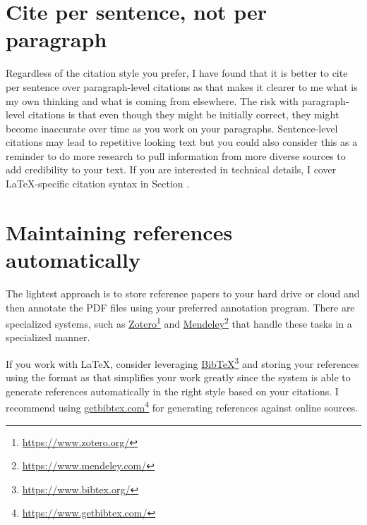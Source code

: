 \section{Cite per sentence, not per paragraph}

Regardless of the citation style you prefer, I have found that it is better to cite per sentence over paragraph-level citations as that makes it clearer to me what is my own thinking and what is coming from elsewhere.
The risk with paragraph-level citations is that even though they might be initially correct, they might become inaccurate over time as you work on your paragraphs.
Sentence-level citations may lead to repetitive looking text but you could also consider this as a reminder to do more research to pull information from more diverse sources to add credibility to your text.
If you are interested in technical details, I cover LaTeX-specific citation syntax in Section .



\section{Maintaining references automatically}


The lightest approach is to store reference papers to your hard drive or cloud and then annotate the PDF files using your preferred annotation program.
There are specialized systems, such as \href{https://www.zotero.org/}{Zotero}\footnote{\url{https://www.zotero.org/}} and \href{https://www.mendeley.com/}{Mendeley}\footnote{\url{https://www.mendeley.com/}} that handle these tasks in a specialized manner.

If you work with LaTeX, consider leveraging \href{https://www.bibtex.org/}{BibTeX}\footnote{\url{https://www.bibtex.org/}} and storing your references using the format as that simplifies your work greatly since the system is able to generate references automatically in the right style based on your citations.
I recommend using \href{https://www.getbibtex.com/}{getbibtex.com}\footnote{\url{https://www.getbibtex.com/}} for generating references against online sources.

